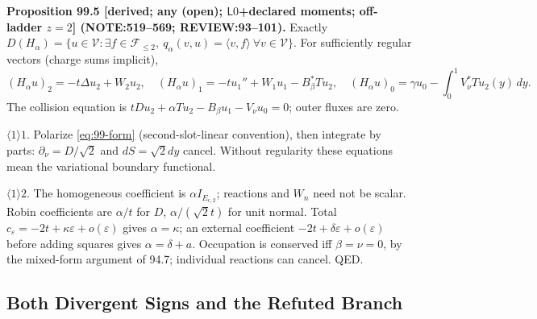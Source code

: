 \textbf{Proposition 99.5 [derived; any (open); \(\mathsf L0\)+declared moments; off-ladder \(z=2\)]
(NOTE:519--569; REVIEW:93--101).}
Exactly \(D(H_\alpha)=\{u\in\mathcal V:\exists f\in\mathcal F_{\le2},\ q_\alpha(v,u)=\langle v,f\rangle\ \forall v\in\mathcal V\}\).
For sufficiently regular vectors (charge sums implicit),
\[
 (H_\alpha u)_2=-t\Delta u_2+W_2u_2,\quad (H_\alpha u)_1=-tu_1''+W_1u_1-B_\beta^*Tu_2,\quad
 (H_\alpha u)_0=\gamma u_0-\int_0^1V_\nu^*Tu_2(y)\,dy .
\]
The collision equation is \(tDu_2+\alpha Tu_2-B_\beta u_1-V_\nu u_0=0\); outer fluxes are zero.
\par\(\langle1\rangle1\). Polarize \eqref{eq:99-form} (second-slot-linear convention), then integrate by parts:
\(\partial_\nu=D/\sqrt2\) and \(dS=\sqrt2dy\) cancel. Without regularity these equations mean the variational boundary functional.
\par\(\langle1\rangle2\). The homogeneous coefficient is \(\alpha I_{E_{c,2}}\); reactions and \(W_n\) need not be scalar.
Robin coefficients are \(\alpha/t\) for \(D\), \(\alpha/(\sqrt2t)\) for unit normal. Total \(c_\varepsilon=-2t+\kappa\varepsilon+o(\varepsilon)\)
gives \(\alpha=\kappa\); an external coefficient \(-2t+\delta\varepsilon+o(\varepsilon)\) before adding squares gives \(\alpha=\delta+a\).
Occupation is conserved iff \(\beta=\nu=0\), by the mixed-form argument of 94.7; individual reactions can cancel. QED.

\subsection{Both Divergent Signs and the Refuted Branch}

